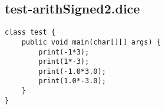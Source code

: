 \subsection{test-arithSigned2.dice}
\begin{verbatim}
class test {
	public void main(char[][] args) {
		print(-1*3);
		print(1*-3);
		print(-1.0*3.0);
		print(1.0*-3.0);
	}
}
\end{verbatim}